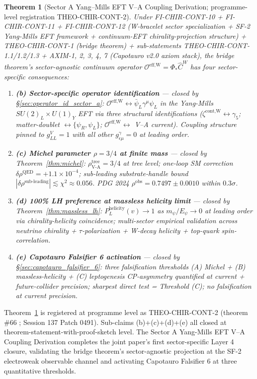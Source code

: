 \documentclass[11pt,letterpaper]{article}
\newtheorem{theorem}{Theorem}[section]
\newcommand{\Phicont}{\Phi_*}
\newcommand{\OeffW}{\mathcal{O}^{\text{eff,W}}}
\begin{document}
\begin{theorem}[Sector A Yang--Mills EFT V--A Coupling Derivation; programme-level registration THEO-CHIR-CONT-2]
\label{thm:sector_a}
Under FI-CHIR-CONT-10 + FI-CHIR-CONT-11 + FI-CHIR-CONT-12 (W-bracelet sector specialization + SF-2 Yang-Mills EFT framework + continuum-EFT chirality-projection structure) + THEO-CHIR-CONT-1 (bridge theorem) + sub-statements THEO-CHIR-CONT-1.1/1.2/1.3 + AXIM-1, 2, 3, 4, 7 (Capotauro v2.0 axiom stack), the bridge theorem's sector-agnostic continuum operator $\OeffW = \Phicont\hat{C}^W$ has four sector-specific consequences:
\begin{enumerate}[leftmargin=*]
\item \textbf{(b) Sector-specific operator identification} --- closed by §\ref{sec:operator_id_sector_a}: $\OeffW \leftrightarrow \bar{\psi}_L \gamma^\mu \psi_L$ in the Yang-Mills $SU(2)_L \times U(1)_Y$ EFT via three structural identifications ($\zeta^{\text{cont,W}} \leftrightarrow \gamma_5$; matter-doublet $\leftrightarrow \{\psi_R, \psi_L\}$; $\OeffW \leftrightarrow$ V--A current). Coupling structure pinned to $g^V_{LL} = 1$ with all other $g^\gamma_{\epsilon\mu} = 0$ at leading order.
\item \textbf{(c) Michel parameter $\rho = 3/4$ at finite mass} --- closed by Theorem~\ref{thm:michel}: $\rho_{\text{V-A}}^{\text{tree}} = 3/4$ at tree level; one-loop SM correction $\delta\rho^{\text{QED}} = +1.1 \times 10^{-4}$; sub-leading substrate-handle bound $|\delta\rho^{\text{sub-leading}}| \lesssim \chi^2 \approx 0.056$. PDG 2024 $\rho^{\text{obs}} = 0.7497 \pm 0.0010$ within $0.3\sigma$.
\item \textbf{(d) 100\% LH preference at massless helicity limit} --- closed by Theorem~\ref{thm:massless_lh}: $P_L^{\text{helicity}}(v) \to 1$ as $m_\psi/E_\psi \to 0$ at leading order via chirality-helicity coincidence; multi-sector empirical validation across neutrino chirality + $\tau$-polarization + W-decay helicity + top-quark spin-correlation.
\item \textbf{(e) Capotauro Falsifier 6 activation} --- closed by §\ref{sec:capotauro_falsifier_6}: three falsification thresholds (A) Michel + (B) massless-helicity + (C) leptogenesis CP-asymmetry quantified at current + future-collider precision; sharpest direct test = Threshold (C); no falsification at current precision.
\end{enumerate}
\end{theorem}

Theorem~\ref{thm:sector_a} is registered at programme level as THEO-CHIR-CONT-2 (theorem \#66 \cite{ResearchFrontier}; Session 137 Patch 0491). Sub-claims (b)+(c)+(d)+(e) all closed at theorem-statement-with-proof-sketch level. The Sector A Yang-Mills EFT V--A Coupling Derivation completes the joint paper's first sector-specific Layer 4 closure, validating the bridge theorem's sector-agnostic projection at the SF-2 electroweak observable channel and activating Capotauro Falsifier 6 at three quantitative thresholds.
\end{document}
